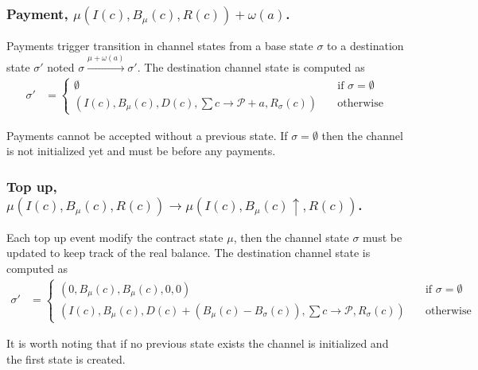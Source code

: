 \documentclass{llncs}
\begin{document}
\subsubsection{Payment, $\mu(I(c), B_\mu(c), R(c))+\omega(a)$.} Payments trigger transition in channel states from a base state $\sigma$ to a destination state $\sigma'$ noted $\sigma \xrightarrow{\mu + \omega(a)} \sigma'$.
The destination channel state is computed as
\begin{equation*}
\begin{split}
  \sigma' &=
  \begin{cases}
      \emptyset & \quad \text{if } \sigma = \emptyset \\
      (I(c), B_\mu(c), D(c), \textstyle \sum c \rightarrow \mathcal{P}+a,R_\sigma(c)) & \quad \text{otherwise}
  \end{cases}
\end{split}
\end{equation*}

Payments cannot be accepted without a previous state. If $\sigma = \emptyset$ then the channel is not initialized yet and must be before any payments.

\subsubsection{Top up, $\mu(I(c), B_\mu(c), R(c)) \rightarrow \mu(I(c), B_\mu(c) \uparrow, R(c))$.} Each top up event modify the contract state $\mu$, then the channel state $\sigma$ must be updated to keep track of the real balance. The destination channel state is computed as \begin{equation*}
\begin{split}
  \sigma' &=
  \begin{cases}
      (0, B_\mu(c), B_\mu(c), 0, 0) & \quad \text{if } \sigma = \emptyset \\
      (I(c), B_\mu(c), D(c) + (B_\mu(c) - B_\sigma(c)), \textstyle \sum c \rightarrow \mathcal{P},R_\sigma(c)) & \quad \text{otherwise}
  \end{cases}
\end{split}
\end{equation*}

It is worth noting that if no previous state exists the channel is initialized and the first state is created.
\end{document}
